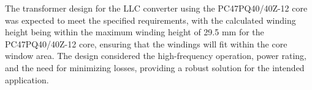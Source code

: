 \noindent
The transformer design for the LLC converter using the PC47PQ40/40Z-12 core was expected to meet the specified requirements, with the calculated winding height being within the maximum winding height of 29.5 mm for the PC47PQ40/40Z-12 core, ensuring that the windings will fit within the core window area. The design considered the high-frequency operation, power rating, and the need for minimizing losses, providing a robust solution for the intended application.